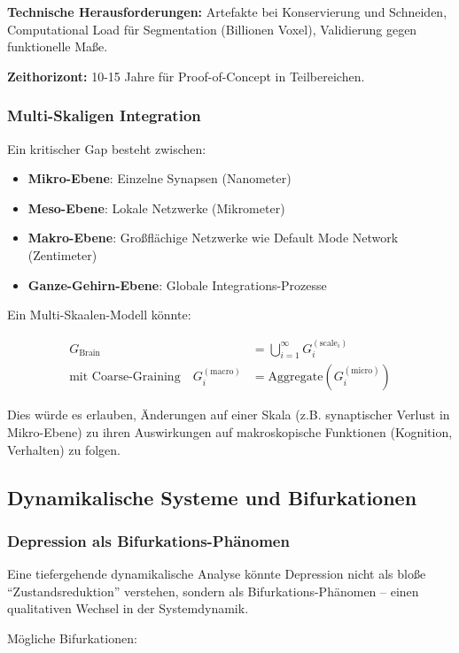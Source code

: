 \documentclass[a4paper,12pt]{article}
\theoremstyle{definition}
\begin{document}
\textbf{Technische Herausforderungen:} Artefakte bei Konservierung und Schneiden, Computational Load für Segmentation (Billionen Voxel), Validierung gegen funktionelle Maße.

\textbf{Zeithorizont:} 10-15 Jahre für Proof-of-Concept in Teilbereichen.

\subsubsection{Multi-Skaligen Integration}

Ein kritischer Gap besteht zwischen:
\begin{itemize}
	\item \textbf{Mikro-Ebene}: Einzelne Synapsen (Nanometer)
	\item \textbf{Meso-Ebene}: Lokale Netzwerke (Mikrometer)
	\item \textbf{Makro-Ebene}: Großflächige Netzwerke wie Default Mode Network (Zentimeter)
	\item \textbf{Ganze-Gehirn-Ebene}: Globale Integrations-Prozesse
\end{itemize}

Ein Multi-Skaalen-Modell könnte:

\begin{align}
G_{\text{Brain}} &= \bigcup_{i=1}^{\infty} G_i^{(\text{scale}_i)} \\
\text{mit Coarse-Graining} \quad G_i^{(\text{macro})} &= \text{Aggregate}(G_i^{(\text{micro})})
\end{align}

Dies würde es erlauben, Änderungen auf einer Skala (z.B. synaptischer Verlust in Mikro-Ebene) zu ihren Auswirkungen auf makroskopische Funktionen (Kognition, Verhalten) zu folgen.

\subsection{Dynamikalische Systeme und Bifurkationen}

\subsubsection{Depression als Bifurkations-Phänomen}

Eine tiefergehende dynamikalische Analyse könnte Depression nicht als bloße ``Zustandsreduktion'' verstehen, sondern als Bifurkations-Phänomen -- einen qualitativen Wechsel in der Systemdynamik.

Mögliche Bifurkationen:
\end{document}
